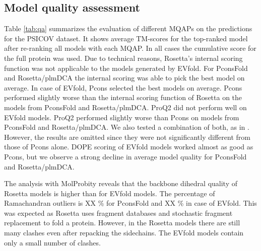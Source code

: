 \documentclass{bioinfo}
\begin{document}
\subsection{Model quality assessment}
Table \ref{tab:qa} summarizes the evaluation of different MQAPs on the
predictions for the PSICOV dataset. It shows average TM-scores for the
top-ranked model after re-ranking all models with each MQAP. In all
cases the cumulative score for the full protein was used. Due to
technical reasons, Rosetta's internal scoring function was not
applicable to the models generated by EVfold. For PconsFold and
Rosetta/plmDCA the internal scoring was able to pick the best model on
average. In case of EVfold, Pcons selected the best models on
average. Pcons performed slightly worse than the internal scoring
function of Rosetta on the models from PconsFold and
Rosetta/plmDCA. ProQ2 did not perform well on EVfold models. ProQ2 performed slightly worse than
Pcons on models from PconsFold and Rosetta/plmDCA. We also tested a
combination of both, as in \citeauthor{wallner_pcons.net:_2007}
\citeyear{wallner_pcons.net:_2007}. However, the results are omitted
since they were not significantly different from those of Pcons
alone. DOPE scoring of EVfold models worked almost as good as Pcons,
but we observe a strong decline in average model quality for PconsFold
and Rosetta/plmDCA.  



The analysis with MolProbity reveals that the backbone dihedral 
quality of Rosetta models is higher than for EVfold models. 
The percentage of Ramachandran outliers is XX \% for PconsFold and 
XX \% in case of EVfold. This was expected as Rosetta uses fragment
databases and stochastic fragment replacement to fold a protein.
However, in the Rosetta models there are still many clashes even 
after repacking the sidechains. The EVfold models contain only a 
small number of clashes.
\end{document}
